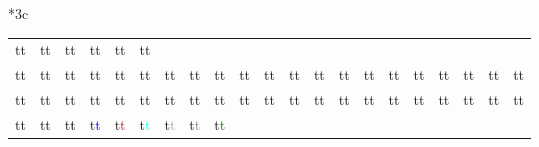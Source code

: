 \begin{longtable}{*3c}
{\begin{tabular}{*{21}c}
{\color{SlateBlue4} t}\textcolor{SlateBlue4} t &
{\color{SlateGray1} t}\textcolor{SlateGray1} t &
{\color{SlateGray2} t}\textcolor{SlateGray2} t &
{\color{SlateGray3} t}\textcolor{SlateGray3} t &
{\color{SlateGray4} t}\textcolor{SlateGray4} t &
{\color{Snow1} t}\textcolor{Snow1} t \\
{\color{Snow2} t}\textcolor{Snow2} t &
{\color{Snow3} t}\textcolor{Snow3} t &
{\color{Snow4} t}\textcolor{Snow4} t &
{\color{SpringGreen1} t}\textcolor{SpringGreen1} t &
{\color{SpringGreen2} t}\textcolor{SpringGreen2} t &
{\color{SpringGreen3} t}\textcolor{SpringGreen3} t &
{\color{SpringGreen4} t}\textcolor{SpringGreen4} t &
{\color{SteelBlue1} t}\textcolor{SteelBlue1} t &
{\color{SteelBlue2} t}\textcolor{SteelBlue2} t &
{\color{SteelBlue3} t}\textcolor{SteelBlue3} t &
{\color{SteelBlue4} t}\textcolor{SteelBlue4} t &
{\color{Tan1} t}\textcolor{Tan1} t &
{\color{Tan2} t}\textcolor{Tan2} t &
{\color{Tan3} t}\textcolor{Tan3} t &
{\color{Tan4} t}\textcolor{Tan4} t &
{\color{Thistle1} t}\textcolor{Thistle1} t &
{\color{Thistle2} t}\textcolor{Thistle2} t &
{\color{Thistle3} t}\textcolor{Thistle3} t &
{\color{Thistle4} t}\textcolor{Thistle4} t &
{\color{Tomato1} t}\textcolor{Tomato1} t &
{\color{Tomato2} t}\textcolor{Tomato2} t \\
{\color{Tomato3} t}\textcolor{Tomato3} t &
{\color{Tomato4} t}\textcolor{Tomato4} t &
{\color{Turquoise1} t}\textcolor{Turquoise1} t &
{\color{Turquoise2} t}\textcolor{Turquoise2} t &
{\color{Turquoise3} t}\textcolor{Turquoise3} t &
{\color{Turquoise4} t}\textcolor{Turquoise4} t &
{\color{VioletRed1} t}\textcolor{VioletRed1} t &
{\color{VioletRed2} t}\textcolor{VioletRed2} t &
{\color{VioletRed3} t}\textcolor{VioletRed3} t &
{\color{VioletRed4} t}\textcolor{VioletRed4} t &
{\color{Wheat1} t}\textcolor{Wheat1} t &
{\color{Wheat2} t}\textcolor{Wheat2} t &
{\color{Wheat3} t}\textcolor{Wheat3} t &
{\color{Wheat4} t}\textcolor{Wheat4} t &
{\color{Yellow1} t}\textcolor{Yellow1} t &
{\color{Yellow2} t}\textcolor{Yellow2} t &
{\color{Yellow3} t}\textcolor{Yellow3} t &
{\color{Yellow4} t}\textcolor{Yellow4} t &
{\color{Gray0} t}\textcolor{Gray0} t &
{\color{Green0} t}\textcolor{Green0} t &
{\color{Grey0} t}\textcolor{Grey0} t \\
{\color{Maroon0} t}\textcolor{Maroon0} t &
{\color{Purple0} t}\textcolor{Purple0} t &
{\color{black} t}\textcolor{black} t &
{\color{blue} t}\textcolor{blue} t &
{\color{brown} t}\textcolor{brown} t &
{\color{cyan} t}\textcolor{cyan} t &
{\color{darkgray} t}\textcolor{darkgray} t &
{\color{gray} t}\textcolor{gray} t &
{\color{green} t}\textcolor{green} t &

\end{tabular}}
\end{longtable}
